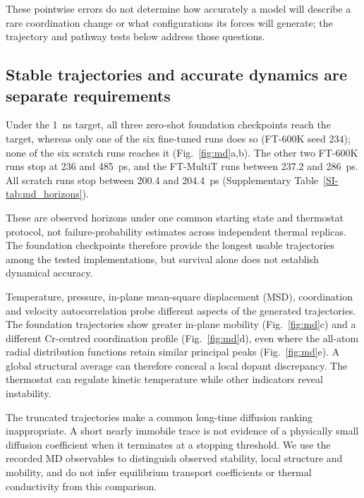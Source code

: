 \documentclass[pdflatex,sn-mathphys-num]{sn-jnl}
\newcommand{\sitab}[1]{Supplementary Table~\ref{SI-#1}}
\begin{document}
These pointwise errors do not determine how accurately a model will describe a rare coordination change or what configurations its forces will generate; the trajectory and pathway tests below address those questions.



\FloatBarrier
\subsection{Stable trajectories and accurate dynamics are separate requirements}\label{sec:md}
Under the 1~ns target, all three zero-shot foundation checkpoints reach the target, whereas only one of the six fine-tuned runs does so (FT-600K seed 234); none of the six scratch runs reaches it (Fig.~\ref{fig:md}a,b). The other two FT-600K runs stop at 236 and 485~ps, and the FT-MultiT runs between 237.2 and 286~ps. All scratch runs stop between 200.4 and 204.4~ps (\sitab{tab:md_horizons}).

These are observed horizons under one common starting state and thermostat protocol, not failure-probability estimates across independent thermal replicas. The foundation checkpoints therefore provide the longest usable trajectories among the tested implementations, but survival alone does not establish dynamical accuracy.

Temperature, pressure, in-plane mean-square displacement (MSD), coordination and velocity autocorrelation probe different aspects of the generated trajectories. The foundation trajectories show greater in-plane mobility (Fig.~\ref{fig:md}c) and a different Cr-centred coordination profile (Fig.~\ref{fig:md}d), even where the all-atom radial distribution functions retain similar principal peaks (Fig.~\ref{fig:md}e). A global structural average can therefore conceal a local dopant discrepancy. The thermostat can regulate kinetic temperature while other indicators reveal instability.

The truncated trajectories make a common long-time diffusion ranking inappropriate. A short nearly immobile trace is not evidence of a physically small diffusion coefficient when it terminates at a stopping threshold. We use the recorded MD observables to distinguish observed stability, local structure and mobility, and do not infer equilibrium transport coefficients or thermal conductivity from this comparison.
\end{document}
